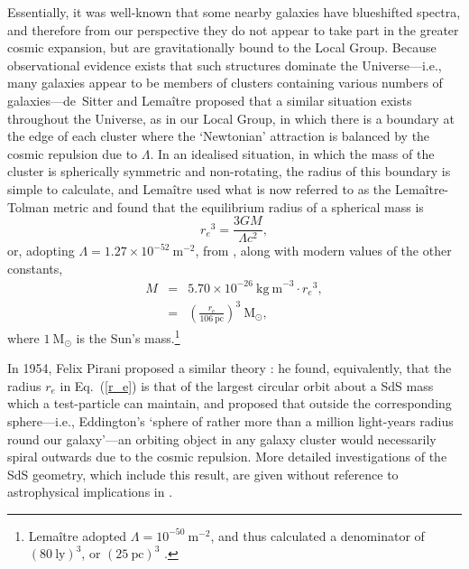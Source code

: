 Essentially, it was well-known that some nearby galaxies have blueshifted spectra, and therefore from our perspective they do not appear to take part in the greater cosmic expansion, but are gravitationally bound to the Local Group. Because observational evidence exists that such structures dominate the Universe---i.e., many galaxies appear to be members of clusters containing various numbers of galaxies---de~Sitter and Lema\^{i}tre proposed that a similar situation exists throughout the Universe, as in our Local Group, in which there is a boundary at the edge of each cluster where the `Newtonian' attraction is balanced by the cosmic repulsion due to $\Lambda$. In an idealised situation, in which the mass of the cluster is spherically symmetric and non-rotating, the radius of this boundary is simple to calculate, and Lema\^{i}tre used what is now referred to as the Lema\^{i}tre-Tolman \cite{Tolman1934} metric and found that the equilibrium radius of a spherical mass is
\begin{equation}
{r_e}^3=\frac{3GM}{\Lambda{c^2}},\label{r_e}
\end{equation}
or, adopting $\Lambda=1.27\times10^{-52}~\mathrm{m}^{-2}$, from \cite{Hinshaw2009}, along with modern values of the other constants,
\begin{eqnarray}
M\!\!\!&=&\!\!\!\nonumber{5.70\times10^{-26}~\mathrm{kg~m}^{-3}}\cdot{{r_e}^3},\\
\!\!\!&=&\!\!\!\left(\frac{r_e}{106~\mathrm{pc}}\right)^3~\mathrm{M_{\odot}},\label{Lemaitre_mass}
\end{eqnarray}
where $1~\mathrm{M_{\odot}}$ is the Sun's mass.\footnote{Lema\^{i}tre adopted $\Lambda=10^{-50}~\mathrm{m}^{-2}$, and thus calculated a denominator of $(80~\mathrm{ly})^3$, or $(25~\mathrm{pc})^3$ \cite{Lemaitre1933}.} 

In 1954, Felix Pirani proposed a similar theory \cite{Pirani1954}: he found, equivalently, that the radius $r_e$ in Eq.~(\ref{r_e}) is that of the largest circular orbit about a SdS mass which a test-particle can maintain, and proposed that outside the corresponding sphere---i.e., Eddington's `sphere of rather more than a million light-years radius round our galaxy'---an orbiting object in any galaxy cluster would necessarily spiral outwards due to the cosmic repulsion. More detailed investigations of the SdS geometry, which include this result, are given without reference to astrophysical implications in \cite{Stuchlik1983,Stuchlik1999}.

